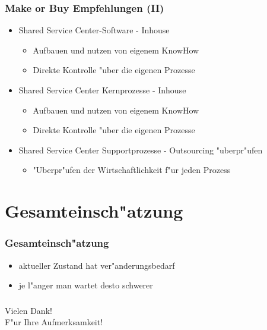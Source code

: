 \documentclass{beamer}
\begin{document}
\begin{frame}
  \frametitle{Make or Buy Empfehlungen (II)}
  \begin{itemize}
  
    \item Shared Service Center-Software - Inhouse
		\begin{itemize}
			\item Aufbauen und nutzen von eigenem KnowHow
			\item Direkte Kontrolle "uber die eigenen Prozesse\vspace{2mm}
		\end{itemize}

	\item Shared Service Center Kernprozesse - Inhouse
		\begin{itemize}
			\item Aufbauen und nutzen von eigenem KnowHow
			\item Direkte Kontrolle "uber die eigenen Prozesse\vspace{2mm}
		\end{itemize}
			
	\item Shared Service Center Supportprozesse - Outsourcing "uberpr"ufen
			\begin{itemize}
			\item "Uberpr"ufen der Wirtschaftlichkeit f"ur jeden Prozess
		\end{itemize}
	
  \end{itemize}
\end{frame}

\section{Gesamteinsch"atzung}
\begin{frame}

  \frametitle{Gesamteinsch"atzung}
   \begin{itemize}
   	\item aktueller Zustand hat ver"anderungsbedarf 
   	\item je l"anger man wartet desto schwerer
   \end{itemize}

\end{frame}

\begin{frame}

  \frametitle{ }
   	Vielen Dank! \\
	F"ur Ihre Aufmerksamkeit!

\end{frame}
\end{document}
